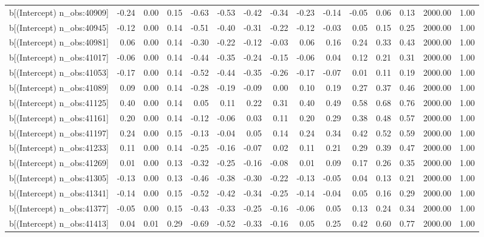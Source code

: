 \begin{table}[ht]
\begin{tabular}{rrrrrrrrrrrrrrr}
  b[(Intercept) n\_obs:40909] & -0.24 & 0.00 & 0.15 & -0.63 & -0.53 & -0.42 & -0.34 & -0.23 & -0.14 & -0.05 & 0.06 & 0.13 & 2000.00 & 1.00 \\ 
  b[(Intercept) n\_obs:40945] & -0.12 & 0.00 & 0.14 & -0.51 & -0.40 & -0.31 & -0.22 & -0.12 & -0.03 & 0.05 & 0.15 & 0.25 & 2000.00 & 1.00 \\ 
  b[(Intercept) n\_obs:40981] & 0.06 & 0.00 & 0.14 & -0.30 & -0.22 & -0.12 & -0.03 & 0.06 & 0.16 & 0.24 & 0.33 & 0.43 & 2000.00 & 1.00 \\ 
  b[(Intercept) n\_obs:41017] & -0.06 & 0.00 & 0.14 & -0.44 & -0.35 & -0.24 & -0.15 & -0.06 & 0.04 & 0.12 & 0.21 & 0.31 & 2000.00 & 1.00 \\ 
  b[(Intercept) n\_obs:41053] & -0.17 & 0.00 & 0.14 & -0.52 & -0.44 & -0.35 & -0.26 & -0.17 & -0.07 & 0.01 & 0.11 & 0.19 & 2000.00 & 1.00 \\ 
  b[(Intercept) n\_obs:41089] & 0.09 & 0.00 & 0.14 & -0.28 & -0.19 & -0.09 & 0.00 & 0.10 & 0.19 & 0.27 & 0.37 & 0.46 & 2000.00 & 1.00 \\ 
  b[(Intercept) n\_obs:41125] & 0.40 & 0.00 & 0.14 & 0.05 & 0.11 & 0.22 & 0.31 & 0.40 & 0.49 & 0.58 & 0.68 & 0.76 & 2000.00 & 1.00 \\ 
  b[(Intercept) n\_obs:41161] & 0.20 & 0.00 & 0.14 & -0.12 & -0.06 & 0.03 & 0.11 & 0.20 & 0.29 & 0.38 & 0.48 & 0.57 & 2000.00 & 1.00 \\ 
  b[(Intercept) n\_obs:41197] & 0.24 & 0.00 & 0.15 & -0.13 & -0.04 & 0.05 & 0.14 & 0.24 & 0.34 & 0.42 & 0.52 & 0.59 & 2000.00 & 1.00 \\ 
  b[(Intercept) n\_obs:41233] & 0.11 & 0.00 & 0.14 & -0.25 & -0.16 & -0.07 & 0.02 & 0.11 & 0.21 & 0.29 & 0.39 & 0.47 & 2000.00 & 1.00 \\ 
  b[(Intercept) n\_obs:41269] & 0.01 & 0.00 & 0.13 & -0.32 & -0.25 & -0.16 & -0.08 & 0.01 & 0.09 & 0.17 & 0.26 & 0.35 & 2000.00 & 1.00 \\ 
  b[(Intercept) n\_obs:41305] & -0.13 & 0.00 & 0.13 & -0.46 & -0.38 & -0.30 & -0.22 & -0.13 & -0.05 & 0.04 & 0.13 & 0.21 & 2000.00 & 1.00 \\ 
  b[(Intercept) n\_obs:41341] & -0.14 & 0.00 & 0.15 & -0.52 & -0.42 & -0.34 & -0.25 & -0.14 & -0.04 & 0.05 & 0.16 & 0.29 & 2000.00 & 1.00 \\ 
  b[(Intercept) n\_obs:41377] & -0.05 & 0.00 & 0.15 & -0.43 & -0.33 & -0.25 & -0.16 & -0.06 & 0.05 & 0.13 & 0.24 & 0.34 & 2000.00 & 1.00 \\ 
  b[(Intercept) n\_obs:41413] & 0.04 & 0.01 & 0.29 & -0.69 & -0.52 & -0.33 & -0.16 & 0.05 & 0.25 & 0.42 & 0.60 & 0.77 & 2000.00 & 1.00 \\ 

\end{tabular}
\end{table}
